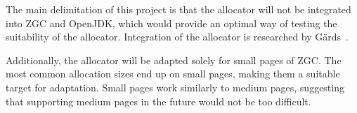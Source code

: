 
The main delimitation of this project is that the allocator will not be integrated into ZGC and OpenJDK, which would provide an optimal way of testing the suitability of the allocator. Integration of the allocator is researched by Gärds~\cite{niclas}.

Additionally, the allocator will be adapted solely for small pages of ZGC. The most common allocation sizes end up on small pages, making them a suitable target for adaptation. Small pages work similarly to medium pages, suggesting that supporting medium pages in the future would not be too difficult. 

